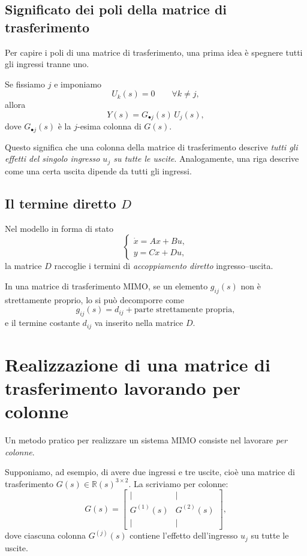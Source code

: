 \subsection{Significato dei poli della matrice di trasferimento}

Per capire i poli di una matrice di trasferimento, una prima idea è spegnere tutti gli ingressi tranne uno.

Se fissiamo \(j\) e imponiamo
\[
U_k(s)=0 \qquad \forall k\neq j,
\]
allora
\[
Y(s)=G_{\bullet j}(s)\,U_j(s),
\]
dove \(G_{\bullet j}(s)\) è la \(j\)-esima colonna di \(G(s)\).

Questo significa che una colonna della matrice di trasferimento descrive \emph{tutti gli effetti del singolo ingresso \(u_j\) su tutte le uscite}. Analogamente, una riga descrive come una certa uscita dipende da tutti gli ingressi.

\subsection{Il termine diretto \(D\)}

Nel modello in forma di stato
\[
\begin{cases}
\dot x=Ax+Bu,\\
y=Cx+Du,
\end{cases}
\]
la matrice \(D\) raccoglie i termini di \emph{accoppiamento diretto} ingresso--uscita.

In una matrice di trasferimento MIMO, se un elemento \(g_{ij}(s)\) non è strettamente proprio, lo si può decomporre come
\[
g_{ij}(s)=d_{ij}+\text{parte strettamente propria},
\]
e il termine costante \(d_{ij}\) va inserito nella matrice \(D\).

\bigskip

\section{Realizzazione di una matrice di trasferimento lavorando per colonne}

Un metodo pratico per realizzare un sistema MIMO consiste nel lavorare \emph{per colonne}.

Supponiamo, ad esempio, di avere due ingressi e tre uscite, cioè una matrice di trasferimento \(G(s)\in\mathbb R(s)^{3\times 2}\). La scriviamo per colonne:
\[
G(s)=
\begin{bmatrix}
\vert & \vert\\
G^{(1)}(s) & G^{(2)}(s)\\
\vert & \vert
\end{bmatrix},
\]
dove ciascuna colonna \(G^{(j)}(s)\) contiene l'effetto dell'ingresso \(u_j\) su tutte le uscite.


